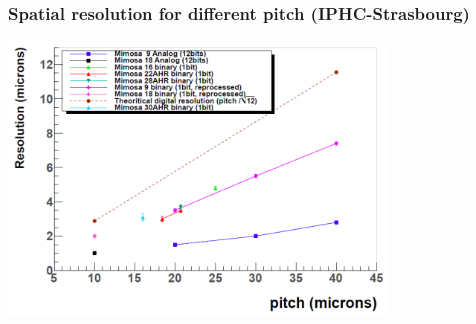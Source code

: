 \documentclass{beamer}
\begin{document}

  \begin{frame}[plain]
    \frametitle{Spatial resolution for different pitch (IPHC-Strasbourg)}

    \vspace{-0.3cm}
    \begin{center}
        \includegraphics[width = 10cm]{Pictures/resolution_pitch_10to40_withBinary.png}
    \end{center}
  \end{frame}

\end{document}
